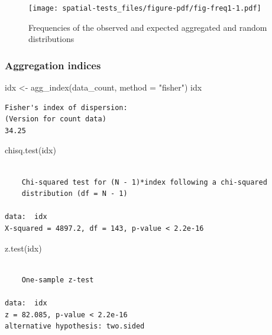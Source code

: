 \documentclass[
  letterpaper,
]{book}
\newenvironment{Shaded}{\begin{snugshade}}{\end{snugshade}}
\newcommand{\AttributeTok}[1]{\textcolor[rgb]{0.40,0.45,0.13}{#1}}
\newcommand{\FunctionTok}[1]{\textcolor[rgb]{0.28,0.35,0.67}{#1}}
\newcommand{\NormalTok}[1]{\textcolor[rgb]{0.00,0.23,0.31}{#1}}
\newcommand{\OtherTok}[1]{\textcolor[rgb]{0.00,0.23,0.31}{#1}}
\newcommand{\StringTok}[1]{\textcolor[rgb]{0.13,0.47,0.30}{#1}}
\begin{document}
\begin{figure}[H]

\texttt{[image: spatial-tests\_files/figure-pdf/fig-freq1-1.pdf]} \hfill{}

\caption{\label{fig-freq1}Frequencies of the observed and expected
aggregated and random distributions}

\end{figure}

\hypertarget{aggregation-indices}{%
\subsubsection{Aggregation indices}\label{aggregation-indices}}

\begin{Shaded}
\begin{Highlighting}[]
\NormalTok{idx }\OtherTok{\textless{}{-}} \FunctionTok{agg\_index}\NormalTok{(data\_count, }\AttributeTok{method =} \StringTok{"fisher"}\NormalTok{)}
\NormalTok{idx}
\end{Highlighting}
\end{Shaded}

\begin{verbatim}
Fisher's index of dispersion:
(Version for count data)
34.25
\end{verbatim}

\begin{Shaded}
\begin{Highlighting}[]
\FunctionTok{chisq.test}\NormalTok{(idx)}
\end{Highlighting}
\end{Shaded}

\begin{verbatim}

    Chi-squared test for (N - 1)*index following a chi-squared
    distribution (df = N - 1)

data:  idx
X-squared = 4897.2, df = 143, p-value < 2.2e-16
\end{verbatim}

\begin{Shaded}
\begin{Highlighting}[]
\FunctionTok{z.test}\NormalTok{(idx)}
\end{Highlighting}
\end{Shaded}

\begin{verbatim}

    One-sample z-test

data:  idx
z = 82.085, p-value < 2.2e-16
alternative hypothesis: two.sided
\end{verbatim}
\end{document}
